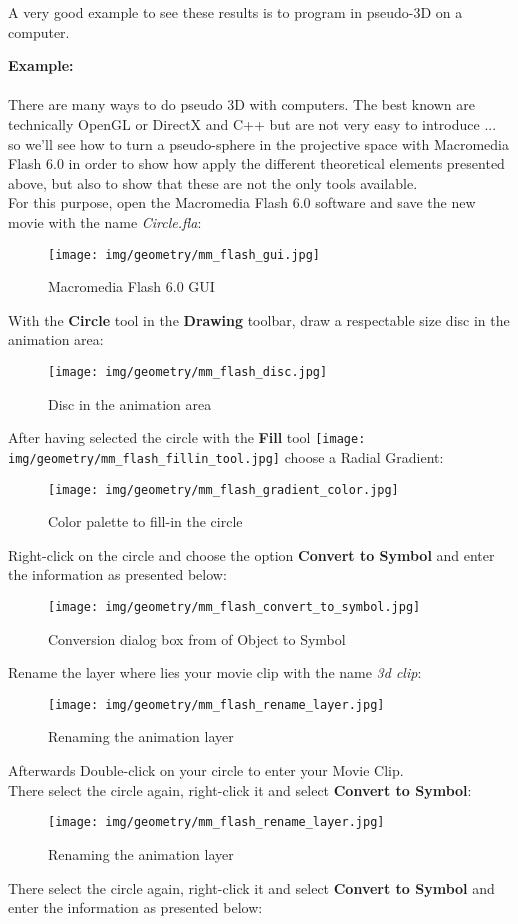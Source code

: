 	A very good example to see these results is to program in pseudo-3D on a computer.
	\begin{tcolorbox}[colframe=black,colback=white,sharp corners]
	\textbf{{\Large {}}Example:}\\\\
	There are many ways to do pseudo 3D with computers. The best known are technically OpenGL or DirectX and C++ but are not very easy to introduce ... so we'll see how to turn a pseudo-sphere in the projective space with Macromedia Flash 6.0 in order to show how apply the different theoretical elements presented above, but also to show that these are not the only tools available.\\
	
	For this purpose, open the Macromedia Flash 6.0 software and save the new movie with the name \textit{Circle.fla}:
	\begin{figure}[H]
		\centering
		\texttt{[image: img/geometry/mm\_flash\_gui.jpg]}
		\caption[]{Macromedia Flash 6.0 GUI}
	\end{figure}
	With the \textbf{Circle} tool in the \textbf{Drawing} toolbar, draw a respectable size disc in the animation area:
	\begin{figure}[H]
		\centering
		\texttt{[image: img/geometry/mm\_flash\_disc.jpg]}
		\caption[]{Disc in the animation area}
	\end{figure}
	\end{tcolorbox}
	\begin{tcolorbox}[colframe=black,colback=white,sharp corners]
	After having selected the circle with the \textbf{Fill} tool \texttt{[image: img/geometry/mm\_flash\_fillin\_tool.jpg]} choose a Radial Gradient:
	\begin{figure}[H]
		\centering
		\texttt{[image: img/geometry/mm\_flash\_gradient\_color.jpg]}
		\caption[]{Color palette to fill-in the circle}
	\end{figure}
	Right-click on the circle and choose the option \textbf{Convert to Symbol} and enter the information as presented below:
	\begin{figure}[H]
		\centering
		\texttt{[image: img/geometry/mm\_flash\_convert\_to\_symbol.jpg]}
		\caption[]{Conversion dialog box from of Object to Symbol}
	\end{figure}
	Rename the layer where lies your movie clip with the name \textit{3d clip}:
	\begin{figure}[H]
		\centering
		\texttt{[image: img/geometry/mm\_flash\_rename\_layer.jpg]}
		\caption[]{Renaming the animation layer}
	\end{figure}
	Afterwards Double-click on your circle to enter your Movie Clip.\\
	
	There select the circle again, right-click it and select \textbf{Convert to Symbol}:
	\begin{figure}[H]
		\centering
		\texttt{[image: img/geometry/mm\_flash\_rename\_layer.jpg]}
		\caption[]{Renaming the animation layer}
	\end{figure}
	There select the circle again, right-click it and select \textbf{Convert to Symbol} and enter the information as presented below:
	\end{tcolorbox}
	
